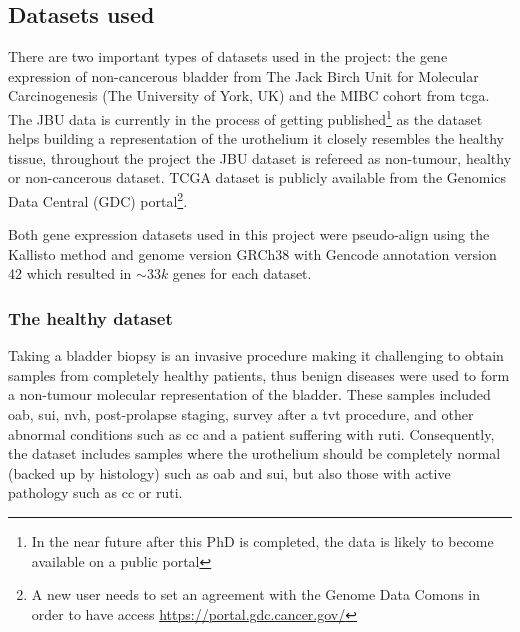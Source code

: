 \subsection{Datasets used} \label{s:lit:datasets_used}

There are two important types of datasets used in the project: the gene expression of non-cancerous bladder from The Jack Birch Unit for Molecular Carcinogenesis (The University of York, UK) and the MIBC cohort from \acrlong{tcga}. The JBU data is currently in the process of getting published\footnote{In the near future after this PhD is completed, the data is likely to become available on a public portal} as the dataset helps building a representation of the urothelium it closely resembles the healthy tissue, throughout the project the JBU dataset is refereed as non-tumour, healthy or non-cancerous dataset. TCGA dataset is publicly available from the Genomics Data Central (GDC) portal\footnote{A new user needs to set an agreement with the Genome Data Comons in order to have access \url{https://portal.gdc.cancer.gov/}}.

Both gene expression datasets used in this project were pseudo-align using the Kallisto method\citep{Bray2016-cv} and genome version GRCh38 with Gencode annotation version 42 which resulted in $\sim33k$ genes for each dataset.

\subsubsection*{The healthy dataset} \label{s:lit:non_tum_data}

Taking a bladder biopsy is an invasive procedure making it challenging to obtain samples from completely healthy patients, thus benign diseases were used to form a non-tumour molecular representation of the bladder. These samples included \acrfull{oab}, \acrfull{sui}, \acrfull{nvh}, post-prolapse staging, survey after a \acrfull{tvt} procedure, and other abnormal conditions such as \acrfull{cc} and a patient suffering with \acrfull{ruti}. Consequently, the dataset includes samples where the urothelium should be completely normal (backed up by histology) such as \acrshort{oab} and \acrshort{sui}, but also those with active pathology such as \acrshort{cc} or \acrshort{ruti}.

